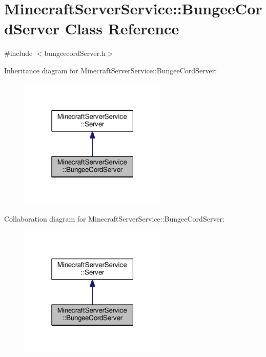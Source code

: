 \hypertarget{class_minecraft_server_service_1_1_bungee_cord_server}{}\section{Minecraft\+Server\+Service\+:\+:Bungee\+Cord\+Server Class Reference}
\label{class_minecraft_server_service_1_1_bungee_cord_server}


{\ttfamily \#include $<$bungeecord\+Server.\+h$>$}



Inheritance diagram for Minecraft\+Server\+Service\+:\+:Bungee\+Cord\+Server\+:\nopagebreak
\begin{figure}[H]
\begin{center}
\leavevmode
\includegraphics[width=199pt]{class_minecraft_server_service_1_1_bungee_cord_server__inherit__graph}
\end{center}
\end{figure}


Collaboration diagram for Minecraft\+Server\+Service\+:\+:Bungee\+Cord\+Server\+:\nopagebreak
\begin{figure}[H]
\begin{center}
\leavevmode
\includegraphics[width=199pt]{class_minecraft_server_service_1_1_bungee_cord_server__coll__graph}
\end{center}
\end{figure}
